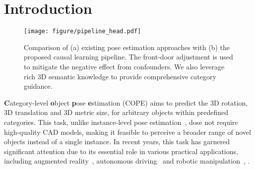 \section{Introduction}
\label{sec:intro}

\begin{figure}[htbp]
\centering
\texttt{[image: figure/pipeline\_head.pdf]}
   \caption{Comparison of (a) existing pose estimation approaches with (b) the proposed causal learning pipeline. The front-door adjustment is used to mitigate the negative effect from confounders. We also leverage rich 3D semantic knowledge to provide comprehensive category guidance.
   }
   \vspace{-0.4cm}
   \label{fig:head_fig}
\end{figure}


\textbf{C}ategory-level \textbf{o}bject \textbf{p}ose \textbf{e}stimation (COPE) aims to predict the 3D rotation, 3D translation and 3D metric size, for arbitrary objects within predefined categories. 
This task, unlike instance-level pose estimation~\cite{wang2019densefusion,zhou2021semi,he2021ffb6d,hai2023shape,li2024mrcnet,lin2024transpose}, dose not require high-quality CAD models, making it feasible to perceive a broader range of novel objects instead of a single instance.
In recent years, this task has garnered significant attention due to its essential role in various practical applications, including augmented reality~\cite{marchand2015pose}, autonomous driving~\cite{chen2017multi} and robotic manipulation~\cite{tremblay2018deep}, \etc.

